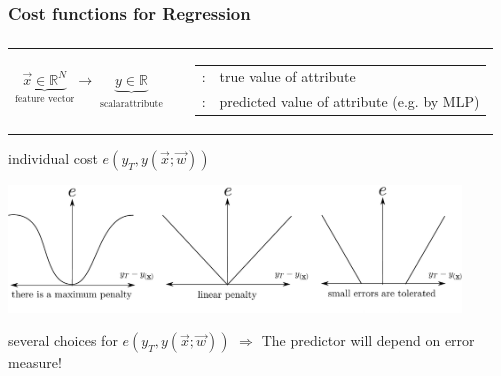 \subsubsection{Cost functions for Regression}

\begin{frame}\frametitle{\subsecname}


  \begin{tabular}{c c c}
    \parbox{4cm}{
      \[ \underbrace{\vec{x}
          \in \mathbb{R}^N
      }_{\text{feature vector}}
      \longrightarrow 
      \underbrace{y
      \in \mathbb{R}
      }_{\substack{\text{scalar}\\ \text{attribute}}}
      \]}
    & & 
    \parbox{8cm}{\footnotesize
      \begin{tabular}{l l}
	$y_T$: & true value of attribute \\
	$y(\vec{x}; \vec w)$: & predicted value of attribute (e.g. by MLP)
      \end{tabular}
    }
  \end{tabular}
     \pause

  \begin{block}{individual cost $e(y_T, y(\vec x; \vec w))$}
    \begin{center} \includegraphics[width=12cm]{img/section1_fig17_v2.pdf} \end{center}
  \end{block}   %
  {several choices for $e(y_T, y(\vec x; \vec w))$ $\Rightarrow$  The predictor will depend on error measure!}
  
\end{frame}

